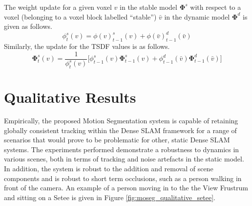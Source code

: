 The weight update for a given voxel $v$ in the stable model $\mathbf{\Phi}^{s}$
with respect to a voxel (belonging to a voxel block labelled ``stable'') 
$\bar{v}$ in the dynamic model $\mathbf{\Phi}^{d}$ is given as follows.
\begin{equation}
  \label{eqn:moseg_weight_update}
  \phi^{s}_{t}(v) = \phi(v)^{s}_{t-1}(v) + \phi(\bar{v})^{d}_{t-1}(\bar{v})
\end{equation}
Similarly, the update for the TSDF values is as follows.
\begin{equation}
  \label{eqn:moseg_sdf_update}
  \mathbf{\Phi}^{s}_{t}(v) = \frac{1}{\phi^{s}_{t}(v)} \bigg[
  \phi^{s}_{t-1}(v) \mathbf{\Phi}^{s}_{t-1}(v) +
  \phi^{d}_{t-1}(\bar{v}) \mathbf{\Phi}^{d}_{t-1}(\bar{v})
  \bigg]
\end{equation}

\section{Qualitative Results}
\label{sec:moseg_qualitative}
Empirically, the proposed Motion Segmentation system is capable of retaining
globally consistent tracking within the Dense SLAM framework for a range of
scenarios that would prove to be problematic for other, static Dense SLAM
systems. The experiments performed demonstrate a robustness	to dynamics in
various scenes, both in terms of tracking and noise artefacts in the static
model. In addition, the system is robust to the addition and removal of scene
components and is robust to short term occlusions, such as a person walking in
front of the camera. An example of a person moving in to the the View Frustrum
and sitting on a Setee is given in Figure \ref{fig:moseg_qualitative_setee}.

